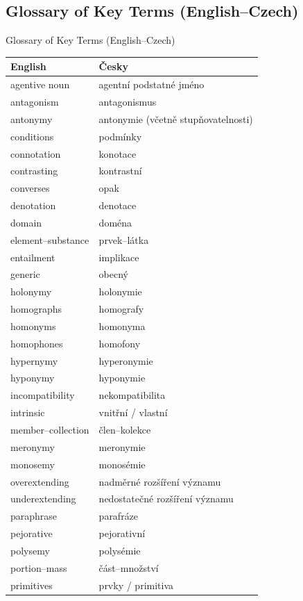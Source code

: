 \subsection*{Glossary of Key Terms (English--Czech)}

\begin{frame}[allowframebreaks]{Glossary of Key Terms (English--Czech)}
  
\begin{longtable}{ll}
  English & Česky \\\hline \endhead
agentive noun & agentní podstatné jméno \\
antagonism & antagonismus \\
antonymy & antonymie (včetně stupňovatelnosti) \\
conditions & podmínky \\
connotation & konotace \\
contrasting & kontrastní \\
converses & opak \\
denotation & denotace \\
domain & doména \\
element–substance & prvek–látka \\
entailment & implikace \\
generic & obecný \\
holonymy & holonymie \\
homographs & homografy \\
homonyms & homonyma \\
homophones & homofony \\
hypernymy & hyperonymie \\
hyponymy & hyponymie \\
incompatibility & nekompatibilita \\
intrinsic & vnitřní / vlastní \\
member–collection & člen–kolekce \\
meronymy & meronymie \\
monosemy & monosémie \\
overextending & nadměrné rozšíření významu \\
underextending & nedostatečné rozšíření významu \\
paraphrase & parafráze \\
pejorative & pejorativní \\
polysemy & polysémie \\
portion–mass & část–množství \\
primitives & prvky / primitiva \\

\end{longtable}
\end{frame}
